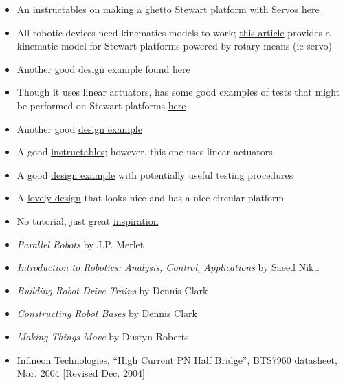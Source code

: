 \documentclass[a4paper, 10pt]{article}
\begin{document}
\begin{itemize}
		\item An instructables on making a ghetto Stewart platform with Servos \href{https://www.instructables.com/Stewart-Platform/}{here}
		
		\item All robotic devices need kinematics models to work; \href{https://www.xarg.org/paper/inverse-kinematics-of-a-stewart-platform/}{this article} provides a kinematic model for Stewart platforms powered by rotary means (ie servo)
		
		\item Another good design example found \href{https://iopscience.iop.org/article/10.1088/1757-899X/563/5/052059/pdf}{here}
		
		\item Though it uses linear actuators, has some good examples of tests that might be performed on Stewart platforms \href{https://www.ncbi.nlm.nih.gov/pmc/articles/PMC6513003/}{here}
		
		\item Another good \href{https://core.ac.uk/download/pdf/322824733.pdf}{design example}
		
		\item A good \href{https://www.instructables.com/Six-Axis-Platform-Using-Linear-Actuators-Stewart-P/}{instructables}; however, this one uses linear actuators
		
		\item A good \href{https://www.ohio.edu/mechanical-faculty/williams/html/PDF/IndRob02.pdf}{design example} with potentially useful testing procedures
		
		\item A \href{https://www.mdpi.com/2218-6581/7/2/30}{lovely design} that looks nice and has a nice circular platform
		
		\item No tutorial, just great \href{https://www.youtube.com/watch?v=kscvCQTtVvw&t=0s}{inspiration}
		
		\item \textit{Parallel Robots} by J.P. Merlet
		
		\item \textit{Introduction to Robotics: Analysis, Control, Applications} by Saeed Niku
		\item \textit{Building Robot Drive Trains} by Dennis Clark
		
		\item \textit{Constructing Robot Bases} by Dennis Clark
		
		\item \textit{Making Things Move} by Dustyn Roberts		
		
		\item Infineon Technologies, ``High Current PN Half Bridge'', BTS7960 datasheet, Mar. 2004 [Revised Dec. 2004]
	\end{itemize}	
\end{document}
